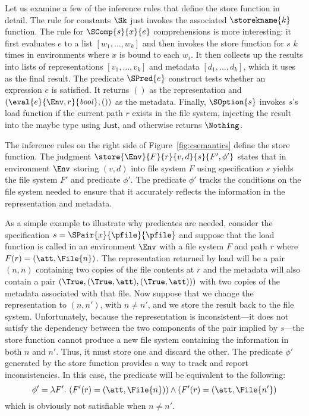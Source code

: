Let us examine a few of the inference rules that define the store
function in detail. The rule for constants $\Sk$ just invokes the
associated $\storekname{k}$ function. The rule for
$\SComp{s}{x}{e}$ comprehensions is more interesting: it first
evaluates $e$ to a list $[w_1,\dots,w_k]$ and then invokes the store
function for $s$ $k$ times in environments where $x$ is bound to each
$w_i$. It then collects up the results into lists of representations
$[v_1,\dots,v_k]$ and metadata $[d_1,\dots,d_k]$, which it uses as the
final result. The predicate $\SPred{e}$ construct tests whether an
expression $e$ is satisfied. It returns $()$ as the representation and
$(\eval{e}{\Env,r}{\mathit{bool}},())$ as the metadata. Finally,
$\SOption{s}$ invokes $s$'s load function if the current path $r$
exists in the file system, injecting the result into the maybe type
using $\mathsf{Just}$, and otherwise returns $\Nothing$.

The inference rules on the right side of
Figure~\ref{fig:csemantics} define the store function. The
judgment $\store{\Env}{F}{r}{v,d}{s}{F',\phi'}$ states that in
environment $\Env$ storing $(v,d)$ into file system $F$ using
specification $s$ yields the file system $F'$ and predicate
$\phi'$. The predicate $\phi'$ tracks the conditions on the file
system needed to ensure that it accurately reflects the information in
the representation and metadata.

As a simple example to illustrate why predicates are needed, consider
the specification $s = \SPair{x}{\pfile}{\pfile}$ and suppose that the
load function is called in an environment $\Env$ with a file system
$F$ and path $r$ where $F(r) = (\att,\File{n})$. The representation
returned by load will be a pair $(n,n)$ containing two copies of the
file contents at $r$ and the metadata will also contain a pair
$(\True,(\True,\att),(\True,\att)))$ with two copies of the metadata
associated with that file. Now suppose that we change the
representation to $(n,n')$, with $n \neq n'$, and we store the result
back to the file system. Unfortunately, because the representation is
inconsistent---it does not satisfy the dependency between the two
components of the pair implied by $s$---the store function cannot
produce a new file system containing the information in both $n$ and
$n'$. Thus, it must store one and discard the other.  The predicate
$\phi'$ generated by the store function provides a way to track and
report inconsistencies. In this case, the predicate will be equivalent
to the following:
%
\[
\phi' = \lambda F'.~ (F'(r) = (\att,\File{n})) \wedge (F'(r) = (\att,\File{n'})
\]
%
which is obviously not satisfiable when $n \not= n'$. 

